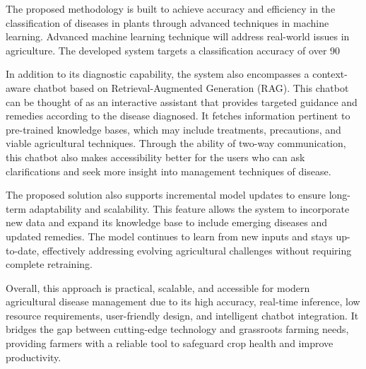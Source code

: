 The proposed methodology is built to achieve accuracy and efficiency in the classification of diseases in plants through advanced techniques in machine learning. Advanced machine learning technique will address real-world issues in agriculture. The developed system targets a classification accuracy of over 90%

In addition to its diagnostic capability, the system also encompasses a context-aware chatbot based on Retrieval-Augmented Generation (RAG). This chatbot can be thought of as an interactive assistant that provides targeted guidance and remedies according to the disease diagnosed. It fetches information pertinent to pre-trained knowledge bases, which may include treatments, precautions, and viable agricultural techniques. Through the ability of two-way communication, this chatbot also makes accessibility better for the users who can ask clarifications and seek more insight into management techniques of disease.

The proposed solution also supports incremental model updates to ensure long-term adaptability and scalability. This feature allows the system to incorporate new data and expand its knowledge base to include emerging diseases and updated remedies. The model continues to learn from new inputs and stays up-to-date, effectively addressing evolving agricultural challenges without requiring complete retraining.

Overall, this approach is practical, scalable, and accessible for modern agricultural disease management due to its high accuracy, real-time inference, low resource requirements, user-friendly design, and intelligent chatbot integration. It bridges the gap between cutting-edge technology and grassroots farming needs, providing farmers with a reliable tool to safeguard crop health and improve productivity.



